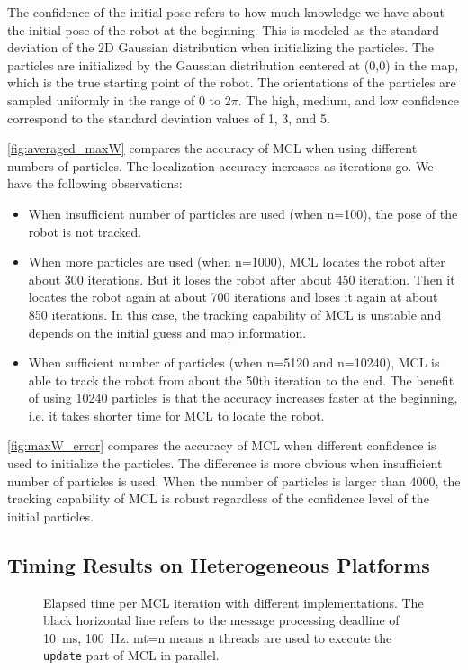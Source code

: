 The confidence of the initial pose refers to how much knowledge we have about
the initial pose of the robot at the beginning.
This is modeled as the standard deviation of the 2D Gaussian distribution when
initializing the particles.
The particles are initialized by the Gaussian distribution centered at (0,0) in
the map, which is the true starting point of the robot.
The orientations of the particles are sampled uniformly in the range of 0 to 2$\pi$.
The high, medium, and low confidence correspond to the standard deviation values
of 1, 3, and 5.

\Fig \ref{fig:averaged_maxW} compares the accuracy of MCL when using different
numbers of particles.
The localization accuracy increases as iterations go.
We have the following observations:
\begin{itemize}
\item When insufficient number of particles are used (\eg when n=100), the pose
  of the robot is not tracked.
\item When more particles are used (\eg when n=1000), MCL locates the robot after
  about 300 iterations.
  But it loses the robot after about 450 iteration.
  Then it locates the robot again at about 700 iterations and loses it again at
  about 850 iterations.
  In this case, the tracking capability of MCL is unstable and depends on the
  initial guess and map information.
\item When sufficient number of particles (\eg when n=5120 and n=10240), MCL is
  able to track the robot from about the 50th iteration to the end.
  The benefit of using 10240 particles is that the accuracy increases faster at
  the beginning, i.e. it takes shorter time for MCL to locate the robot.
\end{itemize}

\Fig \ref{fig:maxW_error} compares the accuracy of MCL when different confidence
is used to initialize the particles.
The difference is more obvious when insufficient number of particles is used.
When the number of particles is larger than 4000, the tracking capability of MCL
is robust regardless of the confidence level of the initial particles.


\subsection{Timing Results on Heterogeneous Platforms}


\begin{figure}[!h]
  \hfil
  \caption{Elapsed time per MCL iteration with different implementations.
    The black horizontal line refers to the message processing deadline of
    \SI{10}{\ms}, \ie \SI{100}{\hertz}.
    mt=n means n threads are used to execute the \texttt{update} part of MCL
    in parallel.}
  \label{fig:compare_cpu_gpu}
\end{figure}

